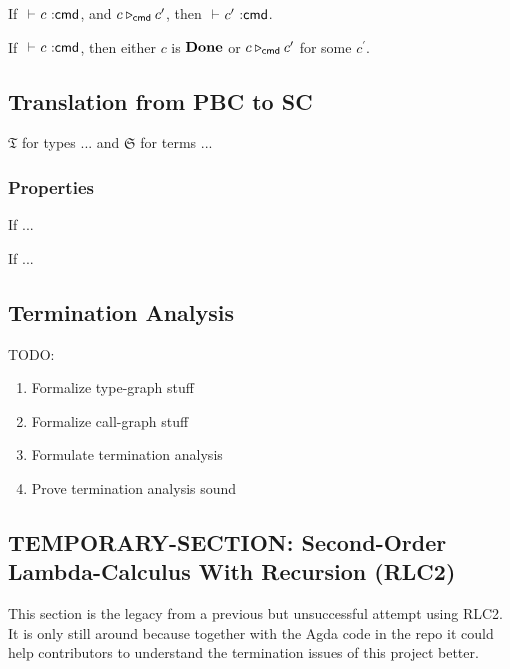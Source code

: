 \begin{theorem}[Preservation]
  If $\typecmd{}{c}$, and $c \triangleright_{\mathsf{cmd}} c^{\prime}$, then $\typecmd{}{c^{\prime}}$.
\end{theorem}

\begin{theorem}[Progress]
  If $\typecmd{}{c}$, then either $c$ is $\mathbf{Done}$ or $c \triangleright_{\mathsf{cmd}} c^{\prime}$ for some $c^{\prime}$.
\end{theorem}

\subsection{Translation from PBC to SC}

$\mathfrak{T}$ for types ... and $\mathfrak{S}$ for terms ...

\subsubsection{Properties}

\begin{lemma}[...]
  If ...
\end{lemma}

\begin{theorem}[...]
  If ...
\end{theorem}

\subsection{Termination Analysis}

TODO:

\begin{enumerate}
  \item Formalize type-graph stuff
  \item Formalize call-graph stuff
  \item Formulate termination analysis
  \item Prove termination analysis sound
\end{enumerate}

\subsection{TEMPORARY-SECTION: Second-Order Lambda-Calculus With Recursion (RLC2)}

This section is the legacy from a previous but unsuccessful attempt using RLC2.
It is only still around because together with the Agda code in the repo it could help contributors to understand the termination issues of this project better.

